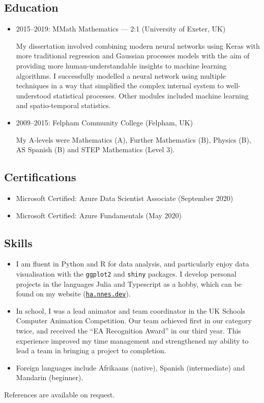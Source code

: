 \documentclass[11pt, a4paper]{article}
\begin{document}
\subsection*{Education}

\begin{itemize} 
	\item 2015--2019: MMath Mathematics --- 2:1 (University of Exeter, UK)

	My dissertation involved combining modern neural networks using Keras with more traditional regression and Gaussian processes models with the aim of providing more human-understandable insights to machine learning algorithms.
	I successfully modelled a neural network using multiple techniques in a way that simplified the complex internal system to well-understood statistical processes.
	Other modules included machine learning and spatio-temporal statistics.

	\item 2009--2015: Felpham Community College (Felpham, UK)

	My A-levels were Mathematics (A), Further Mathematics (B), Physics (B), AS Spanish (B) and STEP Mathematics (Level 3).
\end{itemize}

\subsection*{Certifications}

\begin{itemize}
\item Microsoft Certified: Azure Data Scientist Associate (September 2020)

\item Microsoft Certified: Azure Fundamentals (May 2020)
\end{itemize}

\subsection*{Skills}

\begin{itemize}
	\item I am fluent in Python and R for data analysis, and particularly enjoy data visualisation with the \texttt{ggplot2} and \texttt{shiny} packages.
	I develop personal projects in the languages Julia and Typescript as a hobby, which can be found on my website (\href{https://ha.nnes.dev/}{\nolinkurl{ha.nnes.dev}}).

	\item In school, I was a lead animator and team coordinator in the UK Schools Computer Animation Competition.
	Our team achieved first in our category twice, and received the \enquote{EA Recognition Award} in our third year.
	This experience improved my time management and strengthened my ability to lead a team in bringing a project to completion.

	\item Foreign languages include Afrikaans (native), Spanish (intermediate) and Mandarin (beginner).
\end{itemize}

\noindent References are available on request.
\end{document}
